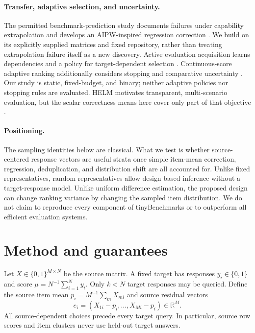 \documentclass{article}
\begin{document}
\paragraph{Transfer, adaptive selection, and uncertainty.}
The permitted benchmark-prediction study documents failures under capability extrapolation and develops an AIPW-inspired regression correction \citep{zhang2025}. We build on its explicitly supplied matrices and fixed repository, rather than treating extrapolation failure itself as a new discovery. Active evaluation acquisition learns dependencies and a policy for target-dependent selection \citep{li2025}. Continuous-score adaptive ranking additionally considers stopping and comparative uncertainty \citep{balkir2026}. Our study is static, fixed-budget, and binary; neither adaptive policies nor stopping rules are evaluated. HELM motivates transparent, multi-scenario evaluation, but the scalar correctness means here cover only part of that objective \citep{liang2023}.

\paragraph{Positioning.}
The sampling identities below are classical. What we test is whether source-centered response vectors are useful strata once simple item-mean correction, regression, deduplication, and distribution shift are all accounted for. Unlike fixed representatives, random representatives allow design-based inference without a target-response model. Unlike uniform difference estimation, the proposed design can change ranking variance by changing the sampled item distribution. We do not claim to reproduce every component of tinyBenchmarks or to outperform all efficient evaluation systems.

\section{Method and guarantees}
\label{sec:method}
Let $X\in\{0,1\}^{M\times N}$ be the source matrix. A fixed target has responses $y_i\in\{0,1\}$ and score $\mu=N^{-1}\sum_{i=1}^N y_i$. Only $k<N$ target responses may be queried. Define the source item mean $p_i=M^{-1}\sum_m X_{mi}$ and source residual vectors
\begin{equation}
e_i=(X_{1i}-p_i,\ldots,X_{Mi}-p_i)\in\mathbb R^M.
\label{eq:embedding}
\end{equation}
All source-dependent choices precede every target query. In particular, source row scores and item clusters never use held-out target answers.
\end{document}
